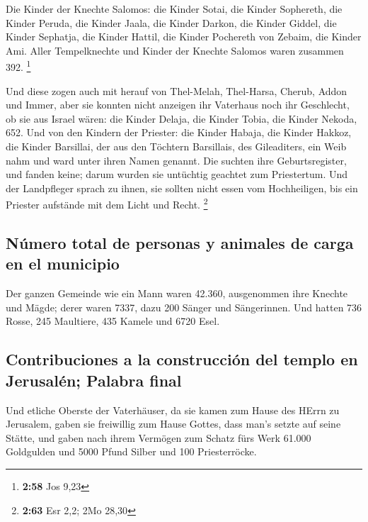  Die Kinder der Knechte Salomos: die Kinder Sotai, die
Kinder Sophereth, die Kinder Peruda,  die Kinder Jaala,
die Kinder Darkon, die Kinder Giddel,  die Kinder
Sephatja, die Kinder Hattil, die Kinder Pochereth von Zebaim, die Kinder
Ami.  Aller Tempelknechte und Kinder der Knechte Salomos
waren zusammen 392. \footnote{\textbf{2:58} Jos 9,23}

 Und diese zogen auch mit herauf von Thel-Melah,
Thel-Harsa, Cherub, Addon und Immer, aber sie konnten nicht anzeigen ihr
Vaterhaus noch ihr Geschlecht, ob sie aus Israel wären: 
die Kinder Delaja, die Kinder Tobia, die Kinder Nekoda, 652.
 Und von den Kindern der Priester: die Kinder Habaja, die
Kinder Hakkoz, die Kinder Barsillai, der aus den Töchtern Barsillais,
des Gileaditers, ein Weib nahm und ward unter ihren Namen genannt.
 Die suchten ihre Geburtsregister, und fanden keine;
darum wurden sie untüchtig geachtet zum Priestertum.  Und
der Landpfleger sprach zu ihnen, sie sollten nicht essen vom
Hochheiligen, bis ein Priester aufstände mit dem Licht und Recht.
\footnote{\textbf{2:63} Esr 2,2; 2Mo 28,30}

\hypertarget{nuxfamero-total-de-personas-y-animales-de-carga-en-el-municipio}{%
\subsection{Número total de personas y animales de carga en el
municipio}\label{nuxfamero-total-de-personas-y-animales-de-carga-en-el-municipio}}

 Der ganzen Gemeinde wie ein Mann waren 42.360,
 ausgenommen ihre Knechte und Mägde; derer waren 7337,
dazu 200 Sänger und Sängerinnen.  Und hatten 736 Rosse,
245 Maultiere,  435 Kamele und 6720 Esel.

\hypertarget{contribuciones-a-la-construcciuxf3n-del-templo-en-jerusaluxe9n-palabra-final}{%
\subsection{Contribuciones a la construcción del templo en Jerusalén;
Palabra
final}\label{contribuciones-a-la-construcciuxf3n-del-templo-en-jerusaluxe9n-palabra-final}}

 Und etliche Oberste der Vaterhäuser, da sie kamen zum
Hause des HErrn zu Jerusalem, gaben sie freiwillig zum Hause Gottes,
dass man's setzte auf seine Stätte,  und gaben nach ihrem
Vermögen zum Schatz fürs Werk 61.000 Goldgulden und 5000 Pfund Silber
und 100 Priesterröcke.

